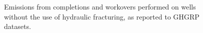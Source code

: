 \documentclass[11pt]{report}
\begin{document}
{{{{\begin{figure}[tb]
\begin{center}
\hfill
{}
\hfill
\caption{Emissions from completions and workovers performed on wells without the use of hydraulic fracturing, as reported to GHGRP datasets.}
\label{fig:CompletionWorkoverBoxNHF}
\end{center}
\end{figure}


}}}}
\end{document}

